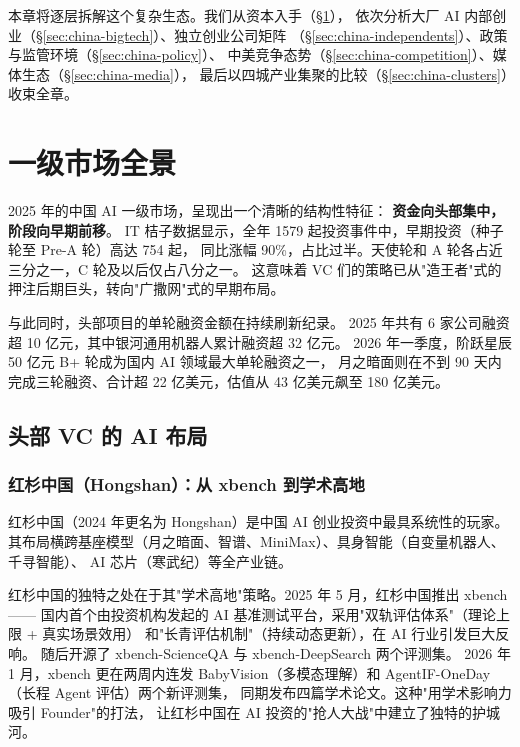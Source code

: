 本章将逐层拆解这个复杂生态。我们从资本入手（§\ref{sec:china-investors}），
依次分析大厂 AI 内部创业（§\ref{sec:china-bigtech}）、独立创业公司矩阵
（§\ref{sec:china-independents}）、政策与监管环境（§\ref{sec:china-policy}）、
中美竞争态势（§\ref{sec:china-competition}）、媒体生态（§\ref{sec:china-media}），
最后以四城产业集聚的比较（§\ref{sec:china-clusters}）收束全章。



\section{一级市场全景}
\label{sec:china-investors}

2025 年的中国 AI 一级市场，呈现出一个清晰的结构性特征：
\textbf{资金向头部集中，阶段向早期前移}。
IT 桔子数据显示，全年 1579 起投资事件中，早期投资（种子轮至 Pre-A 轮）高达 754 起，
同比涨幅 90\%，占比过半。天使轮和 A 轮各占近三分之一，C 轮及以后仅占八分之一。
这意味着 VC 们的策略已从"造王者"式的押注后期巨头，转向"广撒网"式的早期布局。

与此同时，头部项目的单轮融资金额在持续刷新纪录。
2025 年共有 6 家公司融资超 10 亿元，其中银河通用机器人累计融资超 32 亿元。
2026 年一季度，阶跃星辰 50 亿元 B+ 轮成为国内 AI 领域最大单轮融资之一，
月之暗面则在不到 90 天内完成三轮融资、合计超 22 亿美元，估值从 43 亿美元飙至 180 亿美元。

\subsection{头部 VC 的 AI 布局}
\label{subsec:china-vc-landscape}

\subsubsection{红杉中国（Hongshan）：从 xbench 到学术高地}

红杉中国（2024 年更名为 Hongshan）是中国 AI 创业投资中最具系统性的玩家。
其布局横跨基座模型（月之暗面、智谱、MiniMax）、具身智能（自变量机器人、千寻智能）、
AI 芯片（寒武纪）等全产业链。

红杉中国的独特之处在于其"学术高地"策略。2025 年 5 月，红杉中国推出 xbench——
国内首个由投资机构发起的 AI 基准测试平台，采用"双轨评估体系"（理论上限 + 真实场景效用）
和"长青评估机制"（持续动态更新），在 AI 行业引发巨大反响。
随后开源了 xbench-ScienceQA 与 xbench-DeepSearch 两个评测集。
2026 年 1 月，xbench 更在两周内连发 BabyVision（多模态理解）和 AgentIF-OneDay（长程 Agent 评估）两个新评测集，
同期发布四篇学术论文。这种"用学术影响力吸引 Founder"的打法，
让红杉中国在 AI 投资的"抢人大战"中建立了独特的护城河。


